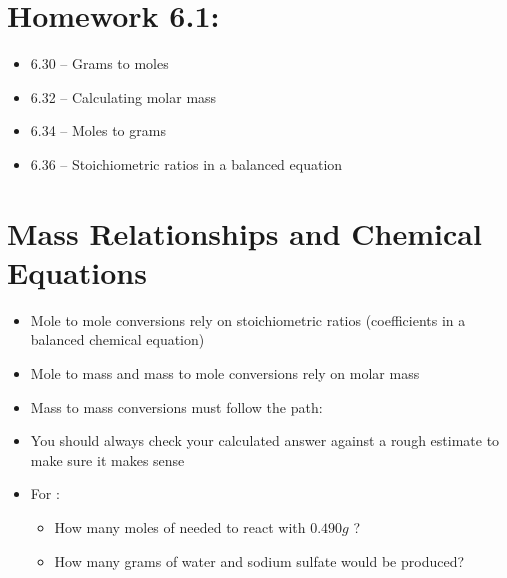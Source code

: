 \documentclass[12pt, openany, letterpaper]{memoir}
\begin{document}
\section*{Homework 6.1:}
\begin{itemize}
	\item 6.30 -- Grams to moles
	\item 6.32 -- Calculating molar mass
	\item 6.34 -- Moles to grams
	\item 6.36 -- Stoichiometric ratios in a balanced equation
\end{itemize}

\section{Mass Relationships and Chemical Equations}
\begin{itemize}
	\item Mole to mole conversions rely on stoichiometric ratios (coefficients in a balanced chemical equation)
	\item Mole to mass and mass to mole conversions rely on molar mass
	\item Mass to mass conversions must follow the path: 
	\item You should always check your calculated answer against a rough estimate to make sure it makes sense
	\item For :
	      \begin{itemize}
		      \item How many  moles of  needed to react with $0.490g$ ?
		      \item How many grams of water and sodium sulfate would be produced?
	      \end{itemize}
\end{itemize}
\end{document}
